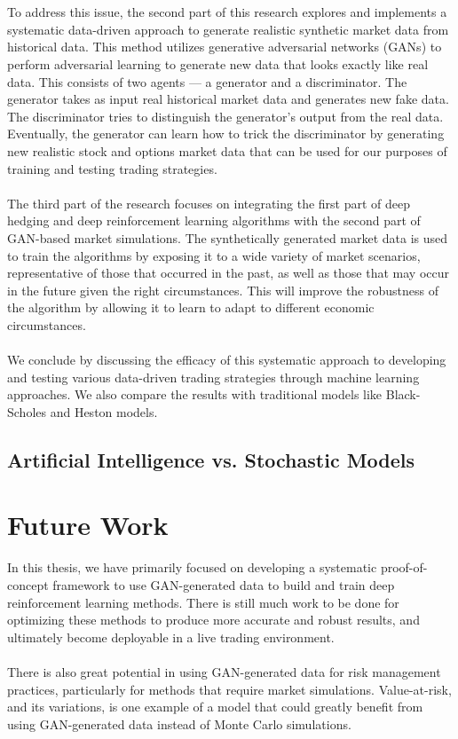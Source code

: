 \\
\\
To address this issue, the second part of this research explores and implements a systematic data-driven approach to generate realistic synthetic market data from historical data. This method utilizes generative adversarial networks (GANs) to perform adversarial learning to generate new data that looks exactly like real data. This consists of two agents — a generator and a discriminator. The generator takes as input real historical market data and generates new fake data. The discriminator tries to distinguish the generator's output from the real data. Eventually, the generator can learn how to trick the discriminator by generating new realistic stock and options market data that can be used for our purposes of training and testing trading strategies.
\\
\\
The third part of the research focuses on integrating the first part of deep hedging and deep reinforcement learning algorithms with the second part of GAN-based market simulations. The synthetically generated market data is used to train the algorithms by exposing it to a wide variety of market scenarios, representative of those that occurred in the past, as well as those that may occur in the future given the right circumstances. This will improve the robustness of the algorithm by allowing it to learn to adapt to different economic circumstances.
\\
\\
We conclude by discussing the efficacy of this systematic approach to developing and testing various data-driven trading strategies through machine learning approaches. We also compare the results with traditional models like Black-Scholes and Heston models.

\subsection{Artificial Intelligence vs. Stochastic Models}

\section{Future Work}
In this thesis, we have primarily focused on developing a systematic proof-of-concept framework to use GAN-generated data to build and train deep reinforcement learning methods. There is still much work to be done for optimizing these methods to produce more accurate and robust results, and ultimately become deployable in a live trading environment.
\\
\\
There is also great potential in using GAN-generated data for risk management practices, particularly for methods that require market simulations. Value-at-risk, and its variations, is one example of a model that could greatly benefit from using GAN-generated data instead of Monte Carlo simulations.
